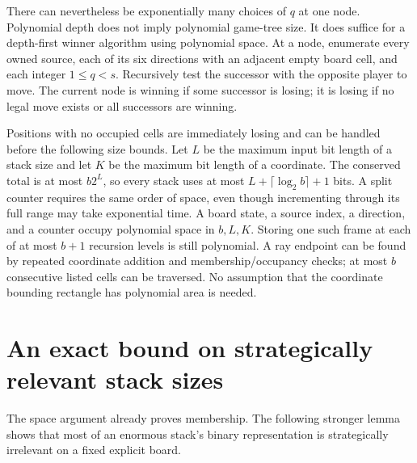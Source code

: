 \documentclass[11pt]{article}
\begin{document}
There can nevertheless be exponentially many choices of $q$ at one node.
Polynomial depth does not imply polynomial game-tree size. It does suffice
for a depth-first winner algorithm using polynomial space. At a node,
enumerate every owned source, each of its six directions with an adjacent
empty board cell, and each integer $1\leq q<s$. Recursively test the
successor with the opposite player to move. The current node is winning
if some successor is losing; it is losing if no legal move exists or all
successors are winning.

Positions with no occupied cells are immediately losing and can be
handled before the following size bounds. Let $L$ be the maximum input
bit length of a stack size and let $K$ be the
maximum bit length of a coordinate. The conserved total is at most
$b2^L$, so every stack uses at most $L+\lceil\log_2 b\rceil+1$ bits.
A split counter requires the same order of space, even though incrementing
through its full range may take exponential time. A board state, a source
index, a direction, and a counter occupy polynomial space in $b,L,K$.
Storing one such frame at each of at most $b+1$ recursion levels is still
polynomial. A ray endpoint can be found by repeated coordinate addition
and membership/occupancy checks; at most $b$ consecutive listed cells can
be traversed. No assumption that the coordinate bounding rectangle has
polynomial area is needed.

\section*{An exact bound on strategically relevant stack sizes}
The space argument already proves membership. The following stronger
lemma shows that most of an enormous stack's binary representation is
strategically irrelevant on a fixed explicit board.
\end{document}
